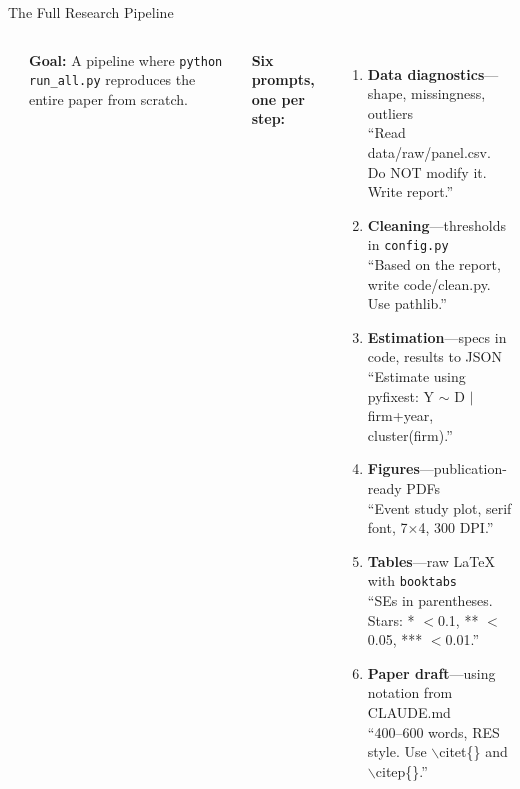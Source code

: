 \documentclass[aspectratio=169,10pt]{beamer}
\begin{document}
\begin{frame}[fragile]{The Full Research Pipeline}
\begin{columns}[T]
\begin{center}
\end{center}

\textbf{Goal:} A pipeline where \texttt{python run\_all.py} reproduces the entire paper from scratch.

\vspace{0.3em}
\textbf{Six prompts, one per step:}
\begin{enumerate}\itemsep1pt
    \item[\textbf{1.}] \textbf{Data diagnostics}---shape, missingness, outliers\\
    {\scriptsize ``Read data/raw/panel.csv. Do NOT modify it. Write report.''}
    \item[\textbf{2.}] \textbf{Cleaning}---thresholds in \texttt{config.py}\\
    {\scriptsize ``Based on the report, write code/clean.py. Use pathlib.''}
    \item[\textbf{3.}] \textbf{Estimation}---specs in code, results to JSON\\
    {\scriptsize ``Estimate using pyfixest: Y $\sim$ D $|$ firm+year, cluster(firm).''}
    \item[\textbf{4.}] \textbf{Figures}---publication-ready PDFs\\
    {\scriptsize ``Event study plot, serif font, 7$\times$4, 300 DPI.''}
    \item[\textbf{5.}] \textbf{Tables}---raw LaTeX with \texttt{booktabs}\\
    {\scriptsize ``SEs in parentheses. Stars: * $<$0.1, ** $<$0.05, *** $<$0.01.''}
    \item[\textbf{6.}] \textbf{Paper draft}---using notation from CLAUDE.md\\
    {\scriptsize ``400--600 words, RES style. Use $\backslash$citet\{\} and $\backslash$citep\{\}.''}
\end{enumerate}


\end{columns}
\end{frame}
\end{document}
